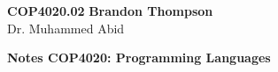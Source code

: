 \noindent
\textbf{COP4020.02} \hfill \textbf{Brandon Thompson} \\
\normalsize Dr. Muhammed Abid\\

\begin{center}
\textbf{Notes COP4020: Programming Languages}
\end{center}
